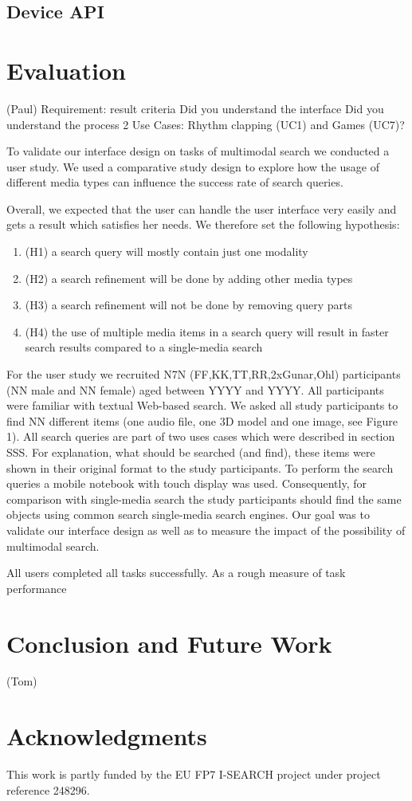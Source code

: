 \documentclass[runningheads,a4paper]{llncs} \usepackage[utf8]{inputenc}
\begin{document}
\subsection{Device API}


\section{Evaluation}
(Paul)
Requirement: result criteria
Did you understand the interface
Did you understand the process
2 Use Cases: Rhythm clapping (UC1) and Games (UC7)?

To validate our interface design on tasks of multimodal search we conducted a user study. 
We used a comparative study design to explore how the usage of different media types can 
influence the success rate of search queries. 

Overall, we expected that the user can handle the user interface very easily and gets a 
result which satisfies her needs. We therefore set the following hypothesis: 
\begin{enumerate}
  \item (H1) a search query will mostly contain just one modality
  \item (H2) a search refinement will be done by adding other media types
  \item (H3) a search refinement will not be done by removing query parts
  \item (H4) the use of multiple media items in a search query will result
  in faster search results compared to a single-media search
\end{enumerate}

For the user study we recruited N7N (FF,KK,TT,RR,2xGunar,Ohl) participants (NN male and NN female) aged between YYYY and YYYY. All participants were familiar with textual Web-based search. We asked all study participants to find NN different items (one audio file, one 3D model and one image, see Figure 1). All search queries are part of two uses cases which were described in section SSS. For explanation, what should be searched (and find), these items were shown in their original format to the study participants. To perform the search queries a mobile notebook with touch display was used. Consequently, for comparison with single-media search the study participants should find the same objects using common search single-media search engines. Our goal was to validate our interface design as well as to measure the impact of the possibility of multimodal search. 

All users completed all tasks successfully. As a rough measure of task performance

\section{Conclusion and Future Work}
(Tom)

\section{Acknowledgments}
This work is partly funded by the EU FP7 \mbox{I-SEARCH} project under project reference 248296.



\end{document}
